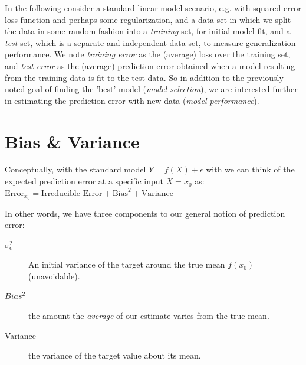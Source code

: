 \documentclass[english,nohyper,titlepage]{tufte-handout}\usepackage{knitr}
\begin{document}
In the following consider a standard linear model scenario, e.g. with squared-error loss function and perhaps some regularization, and a data set in which we split the data in some random fashion into a \emph{training} set, for initial model fit, and a \emph{test} set, which is a separate and independent data set, to measure generalization performance.  We note \emph{training error} as the (average) loss over the training set, and \emph{test error} as the (average) prediction error obtained when a model resulting from the training data is fit to the test data.  So in addition to the previously noted goal of finding the 'best' model (\emph{model selection}), we are interested further in estimating the prediction error with new data (\emph{model performance}).

\section{Bias \& Variance}
Conceptually, with the standard model $Y = f(X) + \epsilon$ with we can think of the expected prediction error at a specific input $X = x_0$ as: \\

\vspace{.25cm}
\noindent $\text{Error}_{x_0} = \text{Irreducible Error} + \text{Bias}^2 + \text{Variance}$
\vspace{.25cm}

In other words, we have three components to our general notion of prediction error: \\

\begin{description}
  \item[$\sigma^2_\epsilon$] An initial variance of the target around the true mean $f(x_0)$ (unavoidable).
  \item[$Bias^2$] the amount the \emph{average} of our estimate varies from the true mean.
  \item[Variance] the variance of the target value about its mean.
\end{description}
\end{document}
